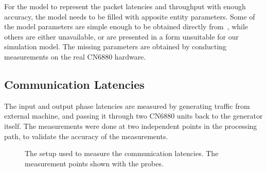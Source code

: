 For the model to represent the packet latencies and throughput with enough accuracy, the model needs to be filled with apposite entity parameters. Some of the model parameters are simple enough to be obtained directly from~\cite{cavium:2010:fundamentals}, while others are either unavailable, or are presented in a form unsuitable for our simulation model. The missing parameters are obtained by conducting measurements on the real CN6880 hardware.




\subsection{Communication Latencies}
\label{sec:communication-latencies}

The input and output phase latencies are measured by generating traffic from external machine, and passing it through two CN6880 units back to the generator itself. The measurements were done at two independent points in the processing path, to validate the accuracy of the measurements.

\begin{figure}[]
  \begin{center}
    
    \caption{The setup used to measure the communication latencies. The measurement points shown with the probes.}
    \label{fig:comm-setup}
  \end{center}
\end{figure}


